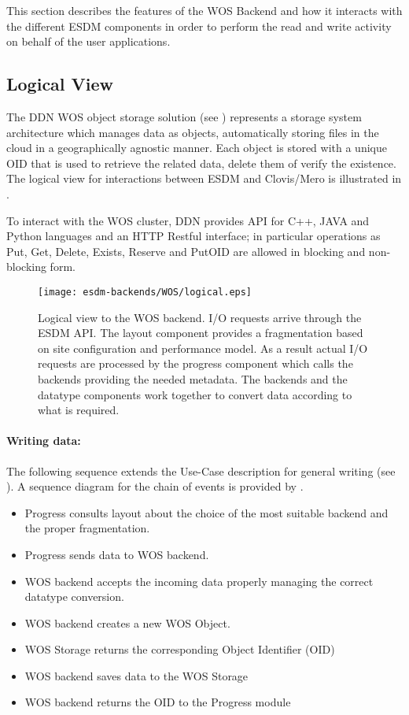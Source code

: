 
This section describes the features of the WOS Backend and how it interacts with the different ESDM components in order to perform the read and write activity on behalf of the user applications.

\subsection{Logical View}

The DDN WOS object storage solution (see ) represents a storage system architecture which manages data as objects, automatically storing files in the cloud in a geographically agnostic manner. Each object is stored with a unique OID that is used to retrieve the related data, delete them of verify the existence.
The logical view for interactions between ESDM and Clovis/Mero is illustrated in .

To interact with the WOS cluster, DDN provides API for C++, JAVA and Python languages and an HTTP Restful interface; in particular operations as Put, Get, Delete, Exists, Reserve and PutOID are allowed in blocking and non-blocking form.

\begin{figure}
	\centering
	\texttt{[image: esdm-backends/WOS/logical.eps]}
	\caption{Logical view to the WOS backend. I/O requests arrive through the ESDM API. The layout component provides a fragmentation based on site configuration and performance model. As a result actual I/O requests are processed by the progress component which calls the backends providing the needed metadata. The backends and the datatype components work together to convert data according to what is required.}
	\label{fig:WOS backend logical view}
\end{figure}

\paragraph{Writing data:}
The following sequence extends the Use-Case description for general writing (see ).
A sequence diagram for the chain of events is provided by .

\begin{itemize}
	\item Progress consults layout about the choice of the most suitable backend and the proper fragmentation.
	\item Progress sends data to WOS backend.
	\item WOS backend accepts the incoming data properly managing the correct datatype conversion.
	\item WOS backend creates a new WOS Object.
	\item WOS Storage returns the corresponding Object Identifier (OID)
	\item WOS backend saves data to the WOS Storage
	\item WOS backend returns the OID to the Progress module
\end{itemize}

